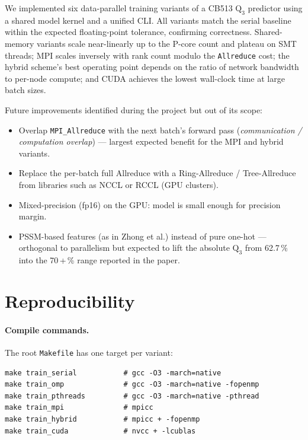 \documentclass[11pt,a4paper]{article}
\begin{document}
We implemented six data-parallel training variants of a CB513
$\mathrm{Q}_3$ predictor using a shared model kernel and a unified CLI.
All variants match the serial baseline within the expected floating-point
tolerance, confirming correctness. Shared-memory variants scale
near-linearly up to the P-core count and plateau on SMT threads; MPI
scales inversely with rank count modulo the \texttt{Allreduce} cost; the
hybrid scheme's best operating point depends on the ratio of network
bandwidth to per-node compute; and CUDA achieves the lowest wall-clock
time at large batch sizes.

Future improvements identified during the project but out of its scope:

\begin{itemize}[noitemsep,topsep=2pt]
  \item Overlap \texttt{MPI\_Allreduce} with the next batch's forward
  pass (\emph{communication / computation overlap}) --- largest expected
  benefit for the MPI and hybrid variants.
  \item Replace the per-batch full Allreduce with a Ring-Allreduce /
  Tree-Allreduce from libraries such as NCCL or RCCL (GPU clusters).
  \item Mixed-precision (fp16) on the GPU: model is small enough for
  precision margin.
  \item PSSM-based features (as in Zhong et al.) instead of pure
  one-hot --- orthogonal to parallelism but expected to lift the
  absolute $\mathrm{Q}_3$ from 62.7\,\% into the 70\,+\,\% range reported
  in the paper.
\end{itemize}

\appendix
\section{Reproducibility}\label{app:repro}

\paragraph{Compile commands.} The root \texttt{Makefile} has one target
per variant:
\begin{lstlisting}
make train_serial           # gcc -O3 -march=native
make train_omp              # gcc -O3 -march=native -fopenmp
make train_pthreads         # gcc -O3 -march=native -pthread
make train_mpi              # mpicc
make train_hybrid           # mpicc + -fopenmp
make train_cuda             # nvcc + -lcublas
\end{lstlisting}
\end{document}
